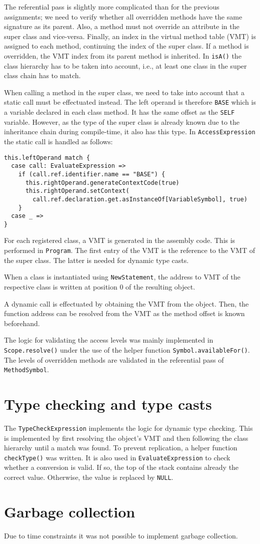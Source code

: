 \documentclass{guide}
\begin{document}
	The referential pass is slightly more complicated than for the previous
	assignments; we need to verify whether all overridden methods have the same
	signature as its parent. Also, a method must not override an attribute in the
	super class and vice-versa. Finally, an index in the virtual method table (VMT)
	is assigned to each method, continuing the index of the super class. If a
	method is overridden, the VMT index from its parent method is inherited. In
	\texttt{isA()} the class hierarchy has to be taken into account, i.e., at least
	one class in the super class chain has to match.

	When calling a method in the super class, we need to take into account that a
	static call must be effectuated instead. The left operand is therefore \texttt{BASE}
	which is a variable declared in each class method. It
	has the same offset as the \texttt{SELF} variable. However, as the type of the super
	class is already known due to the inheritance chain during compile-time, it
	also has this type. In \texttt{AccessExpression} the static call is handled as
	follows:

\begin{verbatim}
this.leftOperand match {
  case call: EvaluateExpression =>
    if (call.ref.identifier.name == "BASE") {
      this.rightOperand.generateContextCode(true)
      this.rightOperand.setContext(
        call.ref.declaration.get.asInstanceOf[VariableSymbol], true)
    }
  case _ =>
}
\end{verbatim}

    For each registered class, a VMT is generated in the assembly code. This
    is performed in \texttt{Program}. The first entry of the VMT is the reference
    to the VMT of the super class. The latter is needed for dynamic type casts.

    When a class is instantiated using \texttt{NewStatement}, the address to
    VMT of the respective class is written at position 0 of the resulting
    object.

	A dynamic call is effectuated by obtaining the VMT from the object. Then, the
	function address can be resolved from the VMT as the method offset is known
	beforehand.

	The logic for validating the access levels was mainly implemented in
	\texttt{Scope.resolve()} under the use of the helper function
	\texttt{Symbol.availableFor()}. The levels of overridden methods are validated
	in the referential pass of \texttt{MethodSymbol}.

	\section{Type checking and type casts}
	The \texttt{TypeCheckExpression} implements the logic for dynamic type
	checking. This is implemented by first resolving the object's VMT and then
	following the class hierarchy until a match was found. To prevent replication,
	a helper function \texttt{checkType()} was written. It is also used in
	\texttt{EvaluateExpression} to check whether a conversion is valid. If so, the
	top of the stack contains already the correct value. Otherwise, the value
	is replaced by \texttt{NULL}.

	\section{Garbage collection}
	Due to time constraints it was not possible to implement garbage collection.

%

\end{document}
